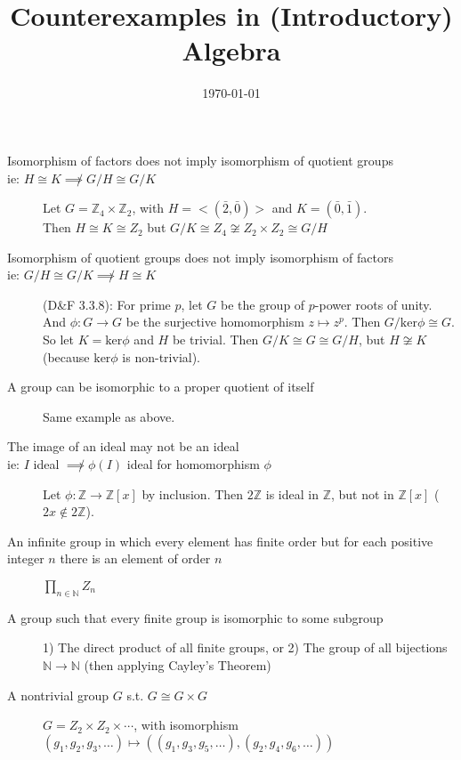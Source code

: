 \documentclass[]{article}
\title{Counterexamples in (Introductory) Algebra}
\author{}
\date{\today}
\newcommand{\x}{\times}
\newcommand{\Z}{\mathbb{Z}}
\begin{document}
\maketitle

\begin{description}
\item[Isomorphism of factors does not imply isomorphism of quotient groups \\
ie: $H \cong K \not\implies G/H \cong G/K$]
Let $G =\Z_4 \x \Z_2$, with $H = <(\bar 2, \bar 0)>$ and $K = (\bar 0, \bar 1)$. \\
Then $H \cong K \cong Z_2$ but $G / K \cong Z_4 \not\cong Z_2 \x Z_2 \cong G / H$

\item[Isomorphism of quotient groups does not imply isomorphism of factors \\
ie: $G/H \cong G/K \not\implies H \cong K$]
(D\&F 3.3.8): For prime $p$, let $G$ be the group of $p$-power roots of unity.
And $\phi: G \to G$ be the surjective homomorphism $z \mapsto z^p$. Then $G /
\text{ker} \phi \cong G$. \\
So let $K = \text{ker}\phi$ and $H$ be trivial. Then $G/K \cong G \cong G/H$,
but $H \not\cong K$ (because $\text{ker} \phi$ is non-trivial).

\item[A group can be isomorphic to a proper quotient of itself]
Same example as above.

\item[The image of an ideal may not be an ideal \\
ie: $I$ ideal $\not\implies \phi(I)$ ideal for homomorphism $\phi$]
Let $\phi: \Z \to \Z[x]$ by inclusion. Then $2\Z$ is ideal in $\Z$, but not in
$\Z[x]$ ($2x \not\in 2\Z$).

\item[An infinite group in which every element has finite order but for each positive
integer $n$ there is an element of order $n$]
$\prod_{n \in \mathbb{N}} Z_n$

\item[A group such that every finite group is isomorphic to some subgroup]
1) The direct product of all finite groups, or 2) The group of all bijections
$\mathbb{N} \to \mathbb{N}$ (then applying Cayley's Theorem)

\item[A nontrivial group $G$ s.t. $G \cong G \x G$]
$G = Z_2 \x Z_2 \x \cdots$, with isomorphism $(g_1, g_2, g_3, \hdots) \mapsto
((g_1, g_3, g_5, \hdots), (g_2, g_4, g_6, \hdots))$


\end{description}
\end{document}
